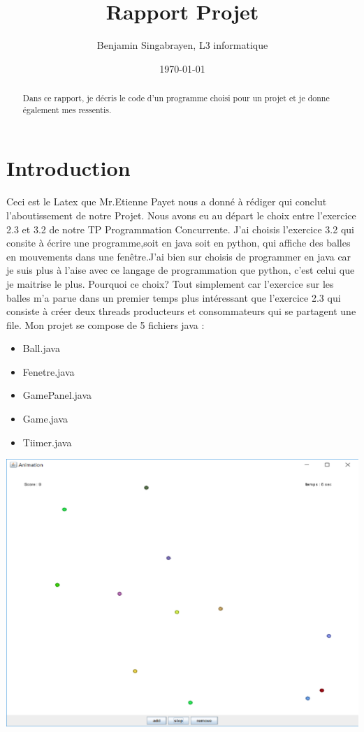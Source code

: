 \documentclass{article}
\title{Rapport Projet}
\author{Benjamin Singabrayen, L3 informatique}
\date{\today}
\begin{document}
\maketitle %


\begin{abstract}
Dans ce rapport, je décris le code d'un programme choisi pour un projet et je donne également mes ressentis.
\end{abstract}

\section{Introduction}
\label{section:introduction} %

Ceci est le Latex que Mr.Etienne Payet nous a donné à rédiger qui conclut l'aboutissement de notre Projet.
Nous avons eu au départ le choix entre l'exercice 2.3 et 3.2 de notre TP Programmation Concurrente. J'ai choisis l'exercice 3.2
qui consite à écrire une programme,soit en java soit en python, qui affiche des balles en mouvements dans une fenêtre.J'ai bien sur
choisis de programmer en java car je suis plus à l'aise avec ce langage de programmation que python, c'est celui que je maitrise le plus.
Pourquoi ce choix? Tout simplement car l'exercice
sur les balles m'a parue dans un premier temps plus intéressant que l'exercice 2.3 qui consiste à créer deux threads producteurs et 
consommateurs qui se partagent une file. 
\vspace{5mm}\newline
Mon projet se compose de 5 fichiers java :
\begin{itemize}
\item Ball.java
\item Fenetre.java
\item GamePanel.java
\item Game.java
\item Tiimer.java
\end{itemize}

\begin{center}
  \includegraphics[scale=0.4]{Ballemouvement.png}
\end{center}
\end{document}
